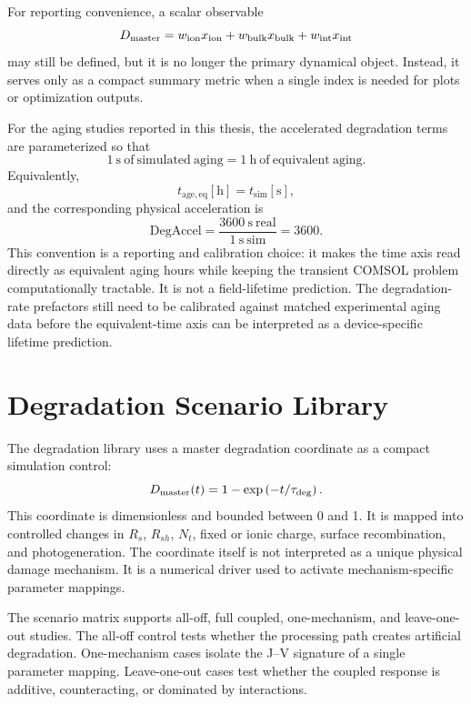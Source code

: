 For reporting convenience, a scalar observable
\begin{equation}
D_{\mathrm{master}} = w_{\mathrm{ion}}x_{\mathrm{ion}} + w_{\mathrm{bulk}}x_{\mathrm{bulk}} + w_{\mathrm{int}}x_{\mathrm{int}}
\end{equation}
may still be defined, but it is no longer the primary dynamical object.
Instead, it serves only as a compact summary metric when a single index is
needed for plots or optimization outputs.

For the aging studies reported in this thesis, the accelerated degradation
terms are parameterized so that
\begin{equation}
1~\mathrm{s~of~simulated~aging}=1~\mathrm{h~of~equivalent~aging}.
\end{equation}
Equivalently,
\begin{equation}
t_{\mathrm{age,eq}}[\mathrm{h}]=t_{\mathrm{sim}}[\mathrm{s}],
\end{equation}
and the corresponding physical acceleration is
\begin{equation}
\mathrm{DegAccel}=\frac{3600~\mathrm{s~real}}{1~\mathrm{s~sim}}=3600.
\end{equation}
This convention is a reporting and calibration choice: it makes the time axis
read directly as equivalent aging hours while keeping the transient COMSOL
problem computationally tractable. It is not a field-lifetime prediction.
The degradation-rate prefactors still need to be calibrated against matched
experimental aging data before the equivalent-time axis can be interpreted as a
device-specific lifetime prediction.

\section{Degradation Scenario Library}

The degradation library uses a master degradation coordinate as a compact
simulation control:
\begin{equation}
D_{\mathrm{master}}(t)=1-\exp\left(-t/\tau_{\mathrm{deg}}\right).
\end{equation}
This coordinate is dimensionless and bounded between 0 and 1. It is mapped into
controlled changes in $R_s$, $R_{sh}$, $N_t$, fixed or ionic charge, surface
recombination, and photogeneration. The coordinate itself is not interpreted as
a unique physical damage mechanism. It is a numerical driver used to activate
mechanism-specific parameter mappings.

The scenario matrix supports all-off, full coupled, one-mechanism, and
leave-one-out studies. The all-off control tests whether the processing path
creates artificial degradation. One-mechanism cases isolate the J--V signature
of a single parameter mapping. Leave-one-out cases test whether the coupled
response is additive, counteracting, or dominated by interactions.

